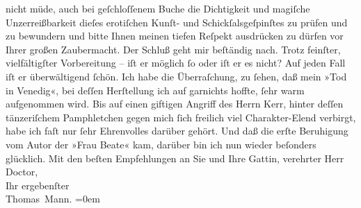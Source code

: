 \begin{ledgroupsized}[t]{13cm}
                    nicht müde, auch bei geſchloſſenem Buche die Dichtigkeit und magiſche
                    Unzerreißbarkeit dieſes erotiſchen Kunſt- und Schickſalsgeſpinſtes zu prüfen und
                    zu bewundern und bitte Ihnen meinen tiefen Reſpekt ausdrücken zu dürfen vor
                    Ihrer großen Zaubermacht. Der Schluß geht mir beſtändig nach. Trotz feinſter,
                    vielfältigſter Vorbereitung – iſt er möglich ſo oder iſt er es nicht? Auf jeden
                    Fall iſt er überwältigend ſchön.\pend
           \pstart
           Ich habe die Überraſchung, zu ſehen, daß mein »Tod
                        in Venedig«, bei deſſen Herſtellung ich {\pb}auf garnichts hoffte, ſehr warm
                    aufgenommen wird. Bis auf einen giftigen Angriff des Herrn Kerr, hinter deſſen tänzeriſchem Pamphletchen gegen mich ſich freilich viel
                    Charakter-Elend verbirgt, habe ich faſt nur ſehr Ehrenvolles darüber gehört. Und
                    daß die erſte Beruhigung vom Autor der »Frau
                        Beate« kam, darüber bin ich nun wieder beſonders glücklich.\pend
           \pstart
           Mit den beſten Empfehlungen an Sie und Ihre Gattin, verehrter Herr Doctor,{\\[\baselineskip]}Ihr ergebenſter{\\[\baselineskip]}\spacefill\mbox{Thomas Mann.}\pend
           \leftskip=0em{}
         
         \endnumbering{}\end{ledgroupsized}  \newcommand{\dateiname}{L02139}\newcommand{\titel}{Thomas Mann an Arthur Schnitzler, 22. 5. 1913}\newcommand{\editorInnen}{Martin Anton Müller und Gerd-Hermann Susen}
      